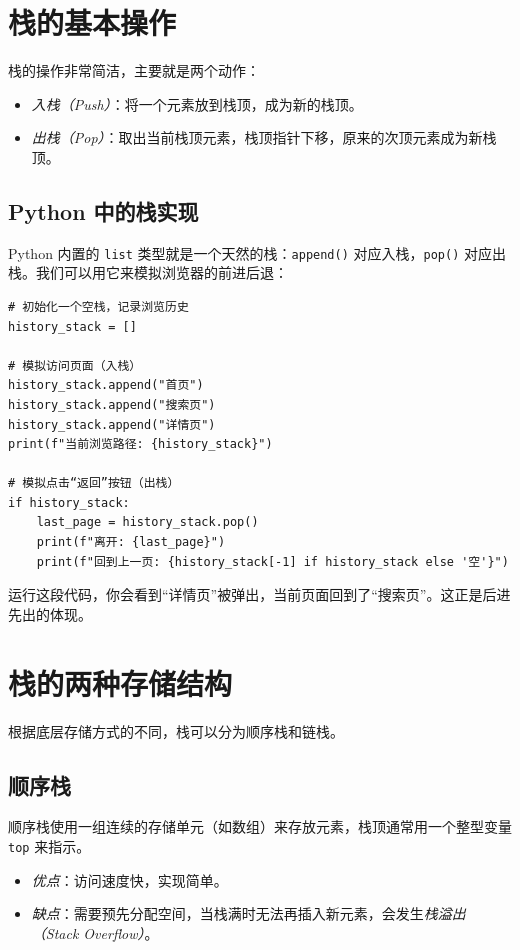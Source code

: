 \section{栈的基本操作}

栈的操作非常简洁，主要就是两个动作：

\begin{itemize}
    \item \emph{入栈（Push）}：将一个元素放到栈顶，成为新的栈顶。
    \item \emph{出栈（Pop）}：取出当前栈顶元素，栈顶指针下移，原来的次顶元素成为新栈顶。
\end{itemize}

\subsection{Python 中的栈实现}

Python 内置的 \texttt{list} 类型就是一个天然的栈：\texttt{append()} 对应入栈，\texttt{pop()} 对应出栈。我们可以用它来模拟浏览器的前进后退：

\begin{verbatim}
# 初始化一个空栈，记录浏览历史
history_stack = []

# 模拟访问页面（入栈）
history_stack.append("首页")
history_stack.append("搜索页")
history_stack.append("详情页")
print(f"当前浏览路径: {history_stack}")

# 模拟点击“返回”按钮（出栈）
if history_stack:
    last_page = history_stack.pop()
    print(f"离开: {last_page}")
    print(f"回到上一页: {history_stack[-1] if history_stack else '空'}")
\end{verbatim}

运行这段代码，你会看到“详情页”被弹出，当前页面回到了“搜索页”。这正是后进先出的体现。

\section{栈的两种存储结构}

根据底层存储方式的不同，栈可以分为顺序栈和链栈。

\subsection{顺序栈}

顺序栈使用一组连续的存储单元（如数组）来存放元素，栈顶通常用一个整型变量 \texttt{top} 来指示。

\begin{itemize}
    \item \emph{优点}：访问速度快，实现简单。
    \item \emph{缺点}：需要预先分配空间，当栈满时无法再插入新元素，会发生\emph{栈溢出（Stack Overflow）}。
\end{itemize}

